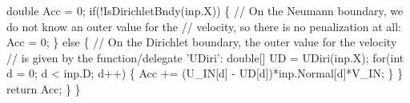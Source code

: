 {\btab \btab double Acc = 0;\newline 
 \newline 
\btab \btab if(!IsDirichletBndy(inp.X)) \{\newline 
\btab \btab \btab // On the Neumann boundary, we do not know an outer value for the\newline 
\btab \btab \btab // velocity, so there is no penalization at all:\newline 
\btab \btab \btab Acc = 0;    \newline 
\btab \btab \} else \{\newline 
\btab \btab \btab // On the Dirichlet boundary, the outer value for the velocity\newline 
\btab \btab \btab // is given by the function/delegate 'UDiri':\newline 
\btab \btab \btab double[] UD = UDiri(inp.X);\newline 
\btab \btab \btab for(int d = 0; d < inp.D; d++) \{\newline 
\btab \btab \btab \btab Acc += (U\_IN[d] - UD[d])*inp.Normal[d]*V\_IN;\newline 
\btab \btab \btab \}\newline 
\btab \btab \}\newline 
\btab \btab return Acc;\newline 
\btab \}\newline 
\}
 }
\BoSSSexe
